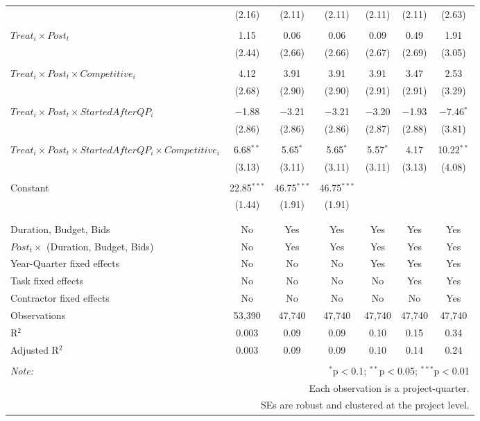 \documentclass[
]{article}
\begin{document}
\begin{table}[H]
\begin{tabular}{@{\extracolsep{-3pt}}lcccccc}
  & (2.16) & (2.11) & (2.11) & (2.11) & (2.11) & (2.63) \\ 
  & & & & & & \\ 
 $Treat_i \times Post_t$ & 1.15 & 0.06 & 0.06 & 0.09 & 0.49 & 1.91 \\ 
  & (2.44) & (2.66) & (2.66) & (2.67) & (2.69) & (3.05) \\ 
  & & & & & & \\ 
 $Treat_i \times Post_t \times Competitive_i$ & 4.12 & 3.91 & 3.91 & 3.91 & 3.47 & 2.53 \\ 
  & (2.68) & (2.90) & (2.90) & (2.91) & (2.91) & (3.29) \\ 
  & & & & & & \\ 
 $Treat_i \times Post_t \times StartedAfterQP_i$ & $-$1.88 & $-$3.21 & $-$3.21 & $-$3.20 & $-$1.93 & $-$7.46$^{*}$ \\ 
  & (2.86) & (2.86) & (2.86) & (2.87) & (2.88) & (3.81) \\ 
  & & & & & & \\ 
 $Treat_i \times Post_t \times StartedAfterQP_i \times Competitive_i$ & 6.68$^{**}$ & 5.65$^{*}$ & 5.65$^{*}$ & 5.57$^{*}$ & 4.17 & 10.22$^{**}$ \\ 
  & (3.13) & (3.11) & (3.11) & (3.11) & (3.13) & (4.08) \\ 
  & & & & & & \\ 
 Constant & 22.85$^{***}$ & 46.75$^{***}$ & 46.75$^{***}$ &  &  &  \\ 
  & (1.44) & (1.91) & (1.91) &  &  &  \\ 
  & & & & & & \\ 
\hline \\[-1.8ex] 
Duration, Budget, Bids & No & Yes & Yes & Yes & Yes & Yes \\ 
$Post_t \times $  (Duration, Budget, Bids) & No & Yes & Yes & Yes & Yes & Yes \\ 
Year-Quarter fixed effects & No & No & No & Yes & Yes & Yes \\ 
Task fixed effects & No & No & No & No & Yes & Yes \\ 
Contractor fixed effects & No & No & No & No & No & Yes \\ 
Observations & 53,390 & 47,740 & 47,740 & 47,740 & 47,740 & 47,740 \\ 
R$^{2}$ & 0.003 & 0.09 & 0.09 & 0.10 & 0.15 & 0.34 \\ 
Adjusted R$^{2}$ & 0.003 & 0.09 & 0.09 & 0.10 & 0.14 & 0.24 \\ 
\hline 
\hline \\[-1.8ex] 
\textit{Note:}  & \multicolumn{6}{r}{$^{*}$p$<$0.1; $^{**}$p$<$0.05; $^{***}$p$<$0.01} \\ 
 & \multicolumn{6}{r}{Each observation is a project-quarter.} \\ 
 & \multicolumn{6}{r}{SEs are robust and clustered at the project level.} \\ 
\end{tabular} 
\end{table}
\end{document}
